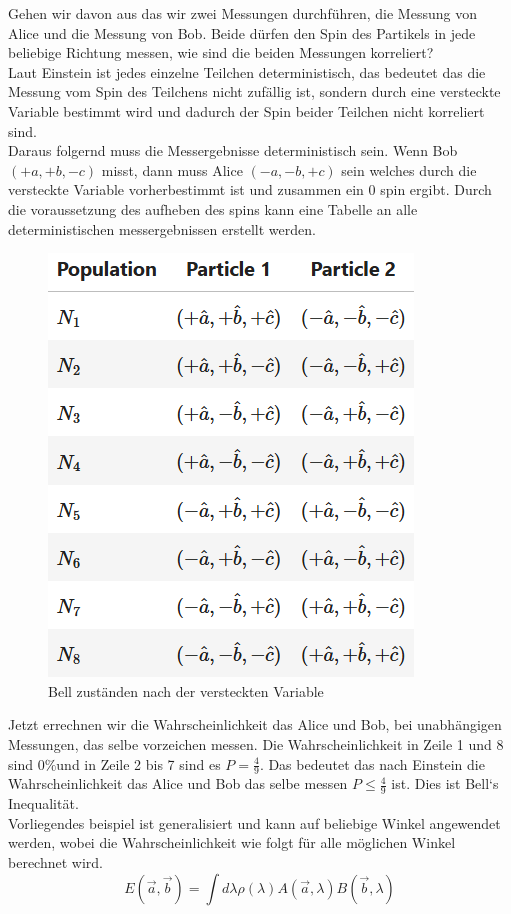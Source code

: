 Gehen wir davon aus das wir zwei Messungen durchführen, die Messung von Alice und die Messung von Bob.
Beide dürfen den Spin des Partikels in jede beliebige Richtung messen, wie sind die beiden Messungen korreliert?\\
Laut Einstein ist jedes einzelne Teilchen deterministisch, das bedeutet das die Messung vom Spin des Teilchens nicht zufällig ist, sondern durch eine versteckte Variable bestimmt wird und dadurch der Spin beider Teilchen nicht korreliert sind.\\
Daraus folgernd muss die Messergebnisse deterministisch sein. Wenn Bob $(+a, +b, -c)$ misst, dann muss Alice $(-a, -b, +c)$ sein welches durch die versteckte Variable vorherbestimmt ist und zusammen ein 0 spin ergibt.
Durch die voraussetzung des aufheben des spins kann eine Tabelle an alle deterministischen messergebnissen erstellt werden.

\begin{figure}[H]
    \centering
    \includegraphics[width=0.5\linewidth]{img/BellList.png}
    \caption{Bell zuständen nach der versteckten Variable}
    \label{fig:BellList}
\end{figure}

Jetzt errechnen wir die Wahrscheinlichkeit das Alice und Bob, bei unabhängigen Messungen, das selbe vorzeichen messen. Die Wahrscheinlichkeit in Zeile 1 und 8 sind $0\%$und in Zeile 2 bis 7 sind es $P = \frac{4}{9}$.
Das bedeutet das nach Einstein die Wahrscheinlichkeit das Alice und Bob das selbe messen $P \leq \frac{4}{9}$ ist. Dies ist Bell`s Inequalität.\\
Vorliegendes beispiel ist generalisiert und kann auf beliebige Winkel angewendet werden, wobei die Wahrscheinlichkeit wie folgt für alle möglichen Winkel berechnet wird.
\begin{equation}
    E(\overrightarrow{a}, \overrightarrow{b}) = \int d\lambda \rho(\lambda) A(\overrightarrow{a}, \lambda) B(\overrightarrow{b}, \lambda)
\end{equation}

